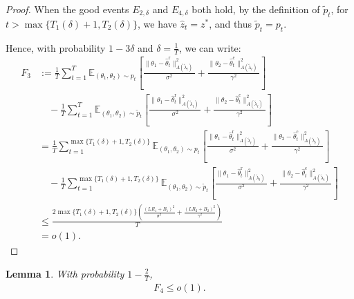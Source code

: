 \documentclass[accepted]{uai2025} %
\theoremstyle{plain}
\newtheorem{lemma}[theorem]{Lemma}
\theoremstyle{definition}
\theoremstyle{remark}
\begin{document}
\begin{proof}
    When the good events \( E_{2, \delta} \) and \( E_{4, \delta} \) both hold, by the definition of \( \tilde{p}_t \), for \( t > \max \{T_1(\delta) + 1, T_2(\delta)\} \), we have \( \hat{z}_t = z^* \), and thus \( \tilde{p}_t = p_t \).
    
    Hence, with probability \( 1 - 3\delta \) and \( \delta = \frac{1}{T} \), we can write:
    \begin{align*}
        F_3 &:= \frac{1}{T} \sum_{t=1}^{T} \mathbb{E}_{(\theta_1, \theta_2) \sim p_t} 
        \left[  \frac{\|\theta_1 - \hat{\theta}_t^{\mathrm{r}}\|_{A(\tilde{\lambda}_t)}^2}{\sigma^2} + \frac{\|\theta_2 - \hat{\theta}_t^{\mathrm{c}}\|_{A(\tilde{\lambda}_t)}^2}{\gamma^2}  \right] \\
        &\quad - \frac{1}{T} \sum_{t=1}^{T} \mathbb{E}_{(\theta_1, \theta_2) \sim \tilde{p}_t} 
        \left[  \frac{\|\theta_1 - \hat{\theta}_t^{\mathrm{r}}\|_{A(\tilde{\lambda}_t)}^2}{\sigma^2} + \frac{\|\theta_2 - \hat{\theta}_t^{\mathrm{c}}\|_{A(\tilde{\lambda}_t)}^2}{\gamma^2}  \right] \\
        &= \frac{1}{T} \sum_{t=1}^{\max \{T_1(\delta) + 1, T_2(\delta)\}} \mathbb{E}_{(\theta_1, \theta_2) \sim p_t} 
        \left[  \frac{\|\theta_1 - \hat{\theta}_t^{\mathrm{r}}\|_{A(\tilde{\lambda}_t)}^2}{\sigma^2} + \frac{\|\theta_2 - \hat{\theta}_t^{\mathrm{c}}\|_{A(\tilde{\lambda}_t)}^2}{\gamma^2} \right] \\
        &\quad - \frac{1}{T} \sum_{t=1}^{\max \{T_1(\delta) + 1, T_2(\delta)\}} \mathbb{E}_{(\theta_1, \theta_2) \sim \tilde{p}_t} 
        \left[  \frac{\|\theta_1 - \hat{\theta}_t^{\mathrm{r}}\|_{A(\tilde{\lambda}_t)}^2}{\sigma^2} + \frac{\|\theta_2 - \hat{\theta}_t^{\mathrm{c}}\|_{A(\tilde{\lambda}_t)}^2}{\gamma^2}  \right] \\
        &\le \frac{2 \max \{T_1(\delta) + 1, T_2(\delta)\} \left( \frac{(LR_1 + B_1)^2}{\sigma^2} + \frac{(LR_2 + B_2)^2}{\gamma^2} \right)}{T} \\
        &= o(1).
    \end{align*}
\end{proof}

\begin{lemma}
With probability \( 1 - \frac{2}{T} \),
\label{lem:Regret_F4}
\begin{align*}
    F_4 \le o(1).
\end{align*}
\end{lemma}
\end{document}
